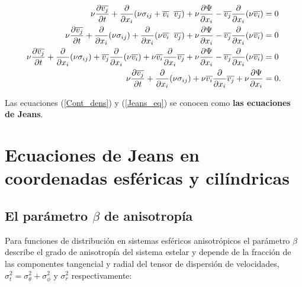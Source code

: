 \begin{align}
\nu \frac{\partial \overline{v_j}}{\partial t} + \frac{\partial }{\partial x_i} (\nu \sigma_{ij}+\overline{v_i}  \hspace{2mm} \overline{v_j} ) + \nu \frac{\partial \Psi }{\partial x_i} - \overline{v_j} \frac{\partial }{\partial x_i} (\nu \overline{v_i}) & = 0\\
\nu \frac{\partial \overline{v_j}}{\partial t} + \frac{\partial }{\partial x_i} (\nu \sigma_{ij} ) + \frac{\partial }{\partial x_i} (\nu \overline{v_i} \hspace{2mm} \overline{v_j} ) + \nu \frac{\partial \Psi }{\partial x_i} - \overline{v_j} \frac{\partial }{\partial x_i} (\nu \overline{v_i}) & = 0\\
\nu \frac{\partial \overline{v_j}}{\partial t} + \frac{\partial }{\partial x_i} (\nu \sigma_{ij} ) +  \overline{v_j} \frac{\partial }{\partial x_i} (\nu \overline{v_i} ) + \nu  \overline{v_i} \frac{\partial }{\partial x_i} \overline{v_j} + \nu \frac{\partial \Psi }{\partial x_i} - \overline{v_j} \frac{\partial }{\partial x_i} (\nu \overline{v_i}) & = 0\\
\label{Jeans_eq}
\nu \frac{\partial \overline{v_j}}{\partial t} + \frac{\partial }{\partial x_i} (\nu \sigma_{ij} )  + \nu  \overline{v_i} \frac{\partial }{\partial x_i} \overline{v_j} + \nu \frac{\partial \Psi }{\partial x_i}  & = 0.
\end{align}

Las ecuaciones (\ref{Cont_dens}) y (\ref{Jeans_eq}) se conocen como \textbf{las ecuaciones de Jeans}.



\section{Ecuaciones de Jeans en coordenadas esféricas y cilíndricas}

\subsection{El parámetro $\beta$ de anisotropía}

Para funciones de distribución en sistemas esféricos anisotrópicos el parámetro $\beta$ describe el grado de anisotropía del sistema estelar y depende de la fracción de las componentes tangencial y radial del tensor de dispersión de velocidades, $\sigma_t^2 = \sigma_\theta^2 + \sigma_\phi^2$ y $\sigma_r^2$ respectivamente:

